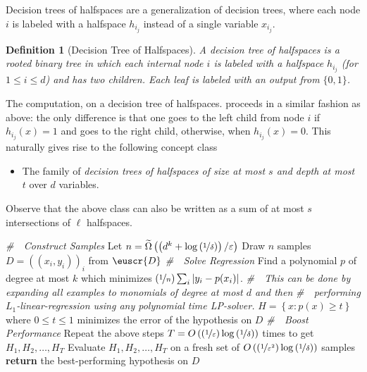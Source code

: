 \documentclass[11pt]{article}
\theoremstyle{plain}
\newtheorem{definition}{Definition}
\theoremstyle{definition}
\theoremstyle{remark}
\def\abs#1{\left| #1 \right|}
\newcommand{\inbrace}[1]{\left\{#1\right\}}
\newcommand{\inparen}[1]{\left(#1\right)}
\newcommand{\sfrac}[2]{{#1/#2}}
\newcommand{\nfrac}[2]{\nicefrac{#1}{#2}}
\newcommand{\eps}{\varepsilon}
\newcommand{\wt}[1]{\widetilde{#1}}
\newcommand{\customcal}[1]{\euscr{#1}}
\newcommand{\cD}{\customcal{D}}
\newcommand{\lreg}{\textsf{L1-Regression}}
\newcommand{\nL}{L}
\begin{document}
    Decision trees of halfspaces are a generalization of decision trees, where each node $i$ is labeled with a halfspace $h_{i_j}$ instead of a single variable $x_{i_j}$.
    \begin{definition}[Decision Tree of Halfspaces]
        A decision tree of halfspaces is a rooted binary tree in which each internal node $i$ is labeled with a halfspace $h_{i_j}$ (for $1\leq i\leq d$) and has two children. 
        Each leaf is labeled with an output from $\{0, 1\}$.
    \end{definition} 
    The computation, on a decision tree of halfspaces. proceeds in a similar fashion as above: the only difference is that one goes to the left child from node $i$ if $h_{i_j}(x)=1$ and goes to the right child, otherwise, when $h_{i_j}(x)=0$.
    This naturally gives rise to the following concept class
    \begin{itemize}
        \item The family of \textit{decision trees of halfspaces of size at most $s$ and depth at most $t$} over $d$ variables. 
    \end{itemize}
    Observe that the above class can also be written as a sum of at most $s$ intersections of $\ell$ halfspaces.
    \begin{algorithm}[h!]
        \caption{\lreg{} \cite{kalai2008agnostically}}
        \begin{algorithmic}[1]
        \Procedure{{\rm\lreg{}}}{$\eps,\delta,k$}
                \vspace{2mm}
                \State \textit{\#~~Construct Samples}
                    \State Let $n=\wt{\Omega}\inparen{\sfrac{\inparen{d^k+\log\inparen{\nfrac{1}{\delta}}}}{\eps}}$ 
                    \State Draw $n$ samples $D=\inparen{(x_i,y_i)}_i$ from $\cD$
                    \vspace{2mm}
                \State \textit{\#~~Solve Regression}
                \State Find a polynomial $p$ of degree at most $k$ which minimizes $\inparen{\nfrac{1}{n}}\sum_{i}\abs{y_i-p(x_i)}$.
                \State \textit{\#~~This can be done by expanding all examples to monomials of degree at most $d$ and then}
                \State \textit{\#~~performing $\nL_1$-linear-regression using any polynomial time LP-solver.}
                \State  $H=\inbrace{x\colon p(x)\geq t}$ where $0\leq t\leq 1$ minimizes the error of the hypothesis on $D$
                \vspace{2mm}
                \State \textit{\#~~Boost Performance}
                \State Repeat the above steps $T=O\inparen{\inparen{\nfrac{1}{\eps}}\log\inparen{\nfrac{1}{\delta}}}$ times to get $H_1,H_2,\dots,H_T$
                \State Evaluate $H_1,H_2,\dots,H_T$ on a fresh set of $O\inparen{\inparen{\nfrac{1}{\eps^2}}\log\inparen{\nfrac{1}{\delta}}}$ samples
                \State \textbf{return} the best-performing hypothesis on $D$
            \EndProcedure
        \end{algorithmic}
        \label{alg:l1reg}
    \end{algorithm}
\end{document}
